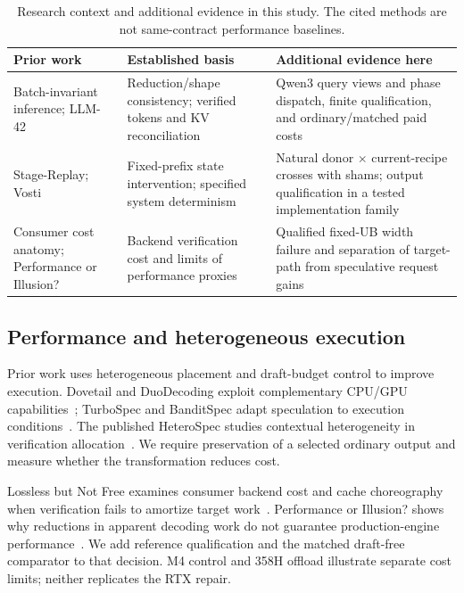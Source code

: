 \begin{table}[t]\centering\small
\caption{Research context and additional evidence in this study. The cited methods are not same-contract performance baselines.}
\label{tab:related}
\begin{tabularx}{\linewidth}{@{}p{.23\linewidth}XX@{}}\toprule
Prior work & Established basis & Additional evidence here\\\midrule
Batch-invariant inference; LLM-42~\cite{thinkingmachines,llm42} & Reduction/shape consistency; verified tokens and KV reconciliation & Qwen3 query views and phase dispatch, finite qualification, and ordinary/matched paid costs\\
Stage-Replay; Vosti~\cite{stagereplay,vosti} & Fixed-prefix state intervention; specified system determinism & Natural donor $\times$ current-recipe crosses with shams; output qualification in a tested implementation family\\
Consumer cost anatomy; Performance or Illusion?~\cite{lossless,illusion} & Backend verification cost and limits of performance proxies & Qualified fixed-UB width failure and separation of target-path from speculative request gains\\\bottomrule
\end{tabularx}
\end{table}

\subsection{Performance and heterogeneous execution}
Prior work uses heterogeneous placement and draft-budget control to improve execution. Dovetail and DuoDecoding exploit complementary CPU/GPU capabilities~\cite{dovetail,duodecoding}; TurboSpec and BanditSpec adapt speculation to execution conditions~\cite{turbospec,banditspec}. The published HeteroSpec studies contextual heterogeneity in verification allocation~\cite{aclheterospec}. We require preservation of a selected ordinary output and measure whether the transformation reduces cost.

Lossless but Not Free examines consumer backend cost and cache choreography when verification fails to amortize target work~\cite{lossless}. Performance or Illusion? shows why reductions in apparent decoding work do not guarantee production-engine performance~\cite{illusion}. We add reference qualification and the matched draft-free comparator to that decision. M4 control and 358H offload illustrate separate cost limits; neither replicates the RTX repair.
